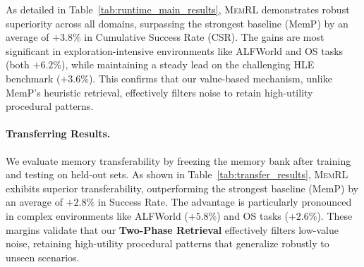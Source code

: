 \documentclass{article}
\theoremstyle{plain}
\theoremstyle{definition}
\theoremstyle{remark}
\begin{document}



As detailed in Table~\ref{tab:runtime_main_results}, \textsc{MemRL} demonstrates robust superiority across all domains, surpassing the strongest baseline (MemP) by an average of $+3.8\%$ in Cumulative Success Rate (CSR). The gains are most significant in exploration-intensive environments like ALFWorld and OS tasks (both $+6.2\%$), while maintaining a steady lead on the challenging HLE benchmark ($+3.6\%$). This confirms that our value-based mechanism, unlike MemP's heuristic retrieval, effectively filters noise to retain high-utility procedural patterns.

\paragraph{Transferring Results.}

We evaluate memory transferability by freezing the memory bank after training and testing on held-out sets.  As shown in Table~\ref{tab:transfer_results}, \textsc{MemRL} exhibits superior transferability, outperforming the strongest baseline (MemP) by an average of $+2.8\%$ in Success Rate. The advantage is particularly pronounced in complex environments like ALFWorld ($+5.8\%$) and OS tasks ($+2.6\%$). These margins validate that our \textbf{Two-Phase Retrieval} effectively filters low-value noise, retaining high-utility procedural patterns that generalize robustly to unseen scenarios.
\end{document}
